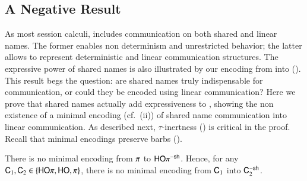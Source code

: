 
\subsection{A Negative Result}
\noi As most session calculi, 
\HOp includes communication on both shared and linear names.
The former enables non determinism and unrestricted behavior; the latter allows to represent
deterministic and linear communication structures.
The expressive power of shared names is also illustrated by our 
encoding from \HOp into \sessp ().
This result begs the question: are shared names truly indispensable for communication, or could they
be encoded using linear communication?
Here we prove that shared names actually add expressiveness to \HOp,
showing 
the non existence of a minimal encoding 
(cf.~(ii))
of shared name communication into linear 
communication. 
As described next, 
$\tau$-inertness () is critical in the proof.
Recall that minimal encodings preserve barbs ().

\begin{theorem}\rm
There is no %
minimal
encoding 
from $\pi$ to $\mathsf{HO}\pi^{\mathsf{-sh}}$. Hence, 
for any $\mathsf{C}_1,\mathsf{C}_2\in \{ \mathsf{HO}\pi, \mathsf{HO}, \pi\}$, 
there is no 
minimal
encoding from $\mathsf{C}_1$ into $\mathsf{C}_2^{-\mathsf{sh}}$.  
\end{theorem}


